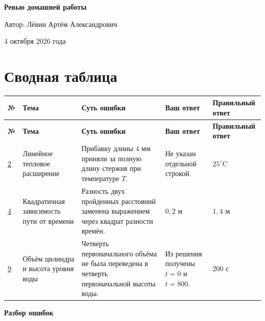 \documentclass[12pt,a4paper]{article}
\begin{document}
\begin{titlepage}
  \centering
  \vspace*{0.25\textheight}
  {\LARGE\bfseries Ревью домашней работы\par}
  \vspace{1.8cm}
  {\large Автор: Лёвин Артём Александрович\par}
  \vspace{0.8cm}
  {\large 4 октября 2026 года\par}
  \vfill
\end{titlepage}

\newpage
\section*{Сводная таблица}
\small
\begin{longtable}{>{\centering\arraybackslash}p{0.9cm} p{2.6cm} p{5.0cm} p{3.3cm} p{3.3cm}}
\toprule
\textbf{№} & \textbf{Тема} & \textbf{Суть ошибки} & \textbf{Ваш ответ} & \textbf{Правильный ответ} \\
\midrule
\endfirsthead
\toprule
\textbf{№} & \textbf{Тема} & \textbf{Суть ошибки} & \textbf{Ваш ответ} & \textbf{Правильный ответ} \\
\midrule
\endhead
\hyperref[task:2]{2} & Линейное тепловое расширение & Прибавку длины $4$ мм приняли за полную длину стержня при температуре $T$. & Не указан отдельной строкой. & $25^{\circ}\mathrm{C}$ \\
\midrule
\hyperref[task:4]{4} & Квадратичная зависимость пути от времени & Разность двух пройденных расстояний заменена выражением через квадрат разности времён. & $0{,}2$ м & $1{,}4$ м \\
\midrule
\hyperref[task:9]{9} & Объём цилиндра и высота уровня воды & Четверть первоначального объёма не была переведена в четверть первоначальной высоты воды. & Из решения получены $t=0$ и $t=800$. & $200$ с \\
\bottomrule
\end{longtable}
\normalsize

\newpage
\thispagestyle{empty}
\vspace*{\fill}
\begin{center}
  {\LARGE\bfseries Разбор ошибок}
\end{center}
\vspace*{\fill}
\end{document}
